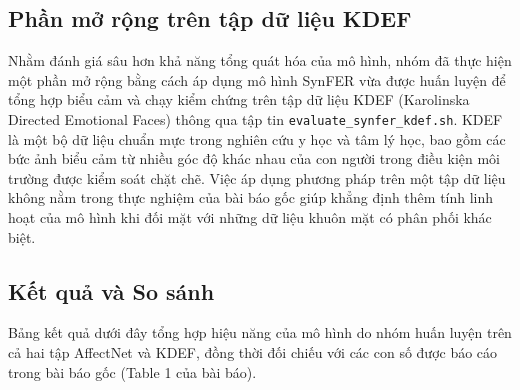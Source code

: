 \subsection{Phần mở rộng trên tập dữ liệu KDEF}
Nhằm đánh giá sâu hơn khả năng tổng quát hóa của mô hình, nhóm đã thực hiện một phần mở rộng bằng cách áp dụng mô hình SynFER vừa được huấn luyện để tổng hợp biểu cảm và chạy kiểm chứng trên tập dữ liệu KDEF (Karolinska Directed Emotional Faces) thông qua tập tin \texttt{evaluate\_synfer\_kdef.sh}. KDEF là một bộ dữ liệu chuẩn mực trong nghiên cứu y học và tâm lý học, bao gồm các bức ảnh biểu cảm từ nhiều góc độ khác nhau của con người trong điều kiện môi trường được kiểm soát chặt chẽ. Việc áp dụng phương pháp trên một tập dữ liệu không nằm trong thực nghiệm của bài báo gốc giúp khẳng định thêm tính linh hoạt của mô hình khi đối mặt với những dữ liệu khuôn mặt có phân phối khác biệt.

\subsection{Kết quả và So sánh}
Bảng kết quả dưới đây tổng hợp hiệu năng của mô hình do nhóm huấn luyện trên cả hai tập AffectNet và KDEF, đồng thời đối chiếu với các con số được báo cáo trong bài báo gốc (Table 1 của bài báo).

